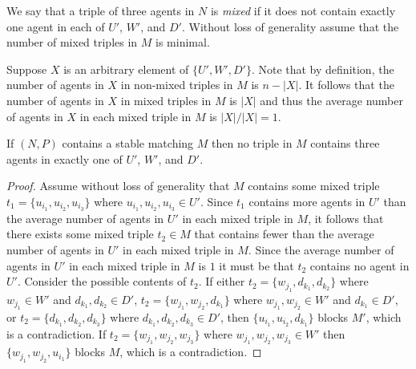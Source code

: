 We say that a triple of three agents in $N$ is \emph{mixed} if it does not contain exactly one agent in each of $U'$, $W'$, and $D'$. Without loss of generality assume that the number of mixed triples in $M$ is minimal.

Suppose $X$ is an arbitrary element of $\{ U', W', D' \}$. Note that by definition, the number of agents in $X$ in non-mixed triples in $M$ is $n - |X|$. It follows that the number of agents in $X$ in mixed triples in $M$ is $|X|$ and thus the average number of agents in $X$ in each mixed triple in $M$ is $|X|/|X| = 1$.

\begin{lem}
\label{lem:threed_sr_b_uuulemma}
If $(N, P)$ contains a stable matching $M$ then no triple in $M$ contains three agents in exactly one of $U'$, $W'$, and $D'$.
\end{lem}
\begin{proof}
Assume without loss of generality that $M$ contains some mixed triple $t_1 = \{ u_{i_1}, u_{i_2}, u_{i_3} \}$ where $u_{i_1}, u_{i_2}, u_{i_3} \in U'$. Since $t_1$ contains more agents in $U'$ than the average number of agents in $U'$ in each mixed triple in $M$, it follows that there exists some mixed triple $t_2 \in M$ that contains fewer than the average number of agents in $U'$ in each mixed triple in $M$. Since the average number of agents in $U'$ in each mixed triple in $M$ is $1$ it must be that $t_2$ contains no agent in $U'$. Consider the possible contents of $t_2$. If either $t_2 = \{ w_{j_1}, d_{k_1}, d_{k_2} \}$ where $w_{j_1} \in W'$ and $d_{k_1}, d_{k_2} \in D'$, $t_2 = \{ w_{j_1}, w_{j_2}, d_{k_1} \}$ where $w_{j_1}, w_{j_2} \in W'$ and $d_{k_1} \in D'$, or $t_2 = \{ d_{k_1}, d_{k_2}, d_{k_3} \}$ where $d_{k_1}, d_{k_2}, d_{k_3} \in D'$, then $\{ u_{i_1}, u_{i_2}, d_{k_1} \}$ blocks $M'$, which is a contradiction. If $t_2 = \{ w_{j_1}, w_{j_2}, w_{j_3} \}$ where $w_{j_1}, w_{j_2}, w_{j_3} \in W'$ then $\{ w_{j_1}, w_{j_2}, u_{i_1} \}$ blocks $M$, which is a contradiction.
\end{proof}

